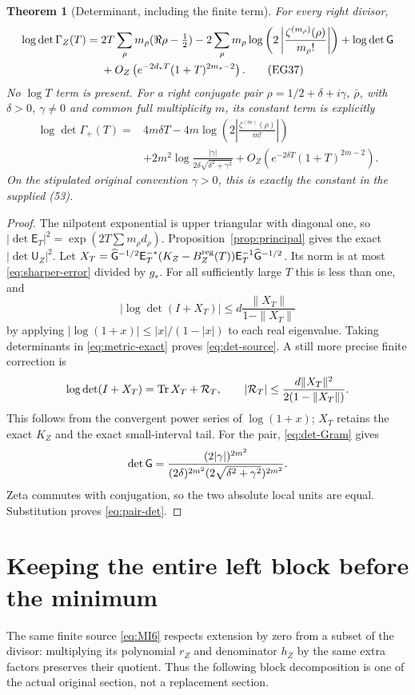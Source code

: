 \documentclass[11pt]{article}
\newtheorem{theorem}{Theorem}[section]
\newcommand{\U}{\mathsf U}\newcommand{\E}{\mathsf E}
\begin{document}
\begin{theorem}[Determinant, including the finite term]\label{thm:det-source}
For every right divisor,
\begin{align}
 \log\det\Gamma_Z(T)
 ={}&2T\sum_\rho m_\rho(\Re\rho-\tfrac12)
 -2\sum_\rho m_\rho\log\left(2\left|
                 \frac{\zeta^{(m_\rho)}(\rho)}{m_\rho!}\right|\right)
 +\log\det\mathsf G\notag\\
 &+O_Z\left(e^{-2d_*T}(1+T)^{2m_*-2}\right).
 \tag{EG37}\label{eq:det-source}
\end{align}
No $\log T$ term is present. For a right conjugate pair
$\rho=1/2+\delta+i\gamma$, $\bar\rho$, with $\delta>0$, $\gamma\ne0$
and common full multiplicity $m$, its constant term is explicitly
\[
 \begin{split}
 \log\det\Gamma_+(T)={}&4m\delta T
 -4m\log\left(2\left|\frac{\zeta^{(m)}(\rho)}{m!}\right|\right)\\
 &+2m^2\log\frac{|\gamma|}{2\delta\sqrt{\delta^2+\gamma^2}}
                  +O_Z(e^{-2\delta T}(1+T)^{2m-2}).
 \end{split}\tag{EG38}\label{eq:pair-det}
\]
On the stipulated original convention $\gamma>0$, this is exactly
the constant in the supplied (53).
\end{theorem}
\begin{proof}
The nilpotent exponential is upper triangular with diagonal one, so
$|\det\E_T|^2=\exp(2T\sum m_\rho d_\rho)$.
Proposition~\ref{prop:principal} gives the exact $|\det\U_Z|^2$.
Let
$X_T=\widehat\G^{-1/2}\E_T^{-*}
(K_Z-B_Z^{\rm reg}(T))\E_T^{-1}\widehat\G^{-1/2}$.
Its norm is at most \eqref{eq:sharper-error} divided by $g_*$.
For all sufficiently large $T$ this is less than one, and
\[
 |\log\det(I+X_T)|\le d\frac{\|X_T\|}{1-\|X_T\|}
\]
by applying $|\log(1+x)|\le |x|/(1-|x|)$ to each real eigenvalue.
Taking determinants in \eqref{eq:metric-exact} proves
\eqref{eq:det-source}. A still more precise finite correction is
\[
 \log\det(I+X_T)=\operatorname{Tr} X_T+\mathcal R_T,\qquad
 |\mathcal R_T|\le\frac{d\|X_T\|^2}{2(1-\|X_T\|)}.
\]
This follows from the convergent power series of $\log(1+x)$;
$X_T$ retains the exact $K_Z$ and the exact small-interval tail.
For the pair, \eqref{eq:det-Gram} gives
\[
 \det\mathsf G=\frac{(2|\gamma|)^{2m^2}}
                 {(2\delta)^{2m^2}(2\sqrt{\delta^2+\gamma^2})^{2m^2}}.
\]
Zeta commutes with conjugation, so the two absolute local units are
equal. Substitution proves \eqref{eq:pair-det}.
\end{proof}

\section{Keeping the entire left block before the minimum}\label{sec:left-quotient}
The same finite source \eqref{eq:MI6} respects extension by zero
from a subset of the divisor: multiplying its polynomial $r_Z$ and
denominator $h_Z$ by the same extra factors preserves their quotient.
Thus the following block decomposition is one of the actual original
section, not a replacement section.
\end{document}
